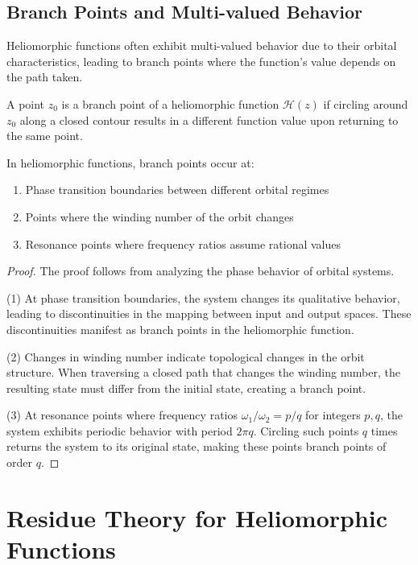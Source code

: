 \subsection{Branch Points and Multi-valued Behavior}

Heliomorphic functions often exhibit multi-valued behavior due to their orbital characteristics, leading to branch points where the function's value depends on the path taken.

\begin{definition}
A point $z_0$ is a branch point of a heliomorphic function $\mathcal{H}(z)$ if circling around $z_0$ along a closed contour results in a different function value upon returning to the same point.
\end{definition}

\begin{theorem}
In heliomorphic functions, branch points occur at:
\begin{enumerate}
    \item Phase transition boundaries between different orbital regimes
    \item Points where the winding number of the orbit changes
    \item Resonance points where frequency ratios assume rational values
\end{enumerate}
\end{theorem}

\begin{proof}
The proof follows from analyzing the phase behavior of orbital systems.

(1) At phase transition boundaries, the system changes its qualitative behavior, leading to discontinuities in the mapping between input and output spaces. These discontinuities manifest as branch points in the heliomorphic function.

(2) Changes in winding number indicate topological changes in the orbit structure. When traversing a closed path that changes the winding number, the resulting state must differ from the initial state, creating a branch point.

(3) At resonance points where frequency ratios $\omega_1/\omega_2 = p/q$ for integers $p, q$, the system exhibits periodic behavior with period $2\pi q$. Circling such points $q$ times returns the system to its original state, making these points branch points of order $q$.
\end{proof}

\section{Residue Theory for Heliomorphic Functions}

